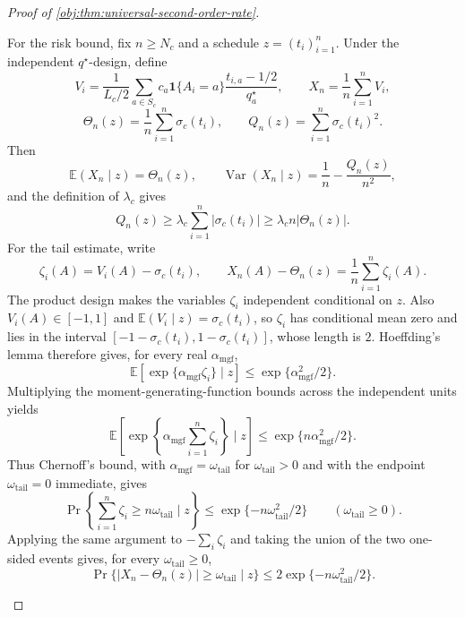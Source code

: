 \begin{proof}[Proof of \cref{obj:thm:universal-second-order-rate}]
\begin{enumerate}
For the risk bound, fix \(n\ge N_c\) and a schedule \(z=(t_i)_{i=1}^n\). Under the independent \(q^\star\)-design, define
\[
V_i=\frac{1}{L_c/2}
\sum_{a\in S_c}
c_a\mathbf 1\{A_i=a\}\frac{t_{i,a}-1/2}{q_a^\star},
\qquad
X_n=\frac1n\sum_{i=1}^n V_i,
\]
\[
\Theta_n(z)=\frac1n\sum_{i=1}^n\sigma_c(t_i),
\qquad
Q_n(z)=\sum_{i=1}^n\sigma_c(t_i)^2 .
\]
Then
\[
\mathbb E(X_n\mid z)=\Theta_n(z),
\qquad
\operatorname{Var}(X_n\mid z)=\frac1n-\frac{Q_n(z)}{n^2},
\]
and the definition of \(\lambda_c\) gives
\[
Q_n(z)\ge \lambda_c\sum_{i=1}^n|\sigma_c(t_i)|
\ge \lambda_c n|\Theta_n(z)|.
\]
For the tail estimate, write
\[
\zeta_i(A)=V_i(A)-\sigma_c(t_i),
\qquad
X_n(A)-\Theta_n(z)=\frac1n\sum_{i=1}^n\zeta_i(A).
\]
The product design makes the variables \(\zeta_i\) independent conditional on \(z\). Also \(V_i(A)\in[-1,1]\) and \(\mathbb E(V_i\mid z)=\sigma_c(t_i)\), so \(\zeta_i\) has conditional mean zero and lies in the interval \([-1-\sigma_c(t_i),1-\sigma_c(t_i)]\), whose length is \(2\). Hoeffding's lemma therefore gives, for every real \(\alpha_{\mathrm{mgf}}\),
\[
\mathbb E\!\left[\exp\{\alpha_{\mathrm{mgf}}\zeta_i\}\mid z\right]
\le
\exp\{\alpha_{\mathrm{mgf}}^2/2\}.
\]
Multiplying the moment-generating-function bounds across the independent units yields
\[
\mathbb E\!\left[\exp\!\left\{\alpha_{\mathrm{mgf}}\sum_{i=1}^n\zeta_i\right\}\mid z\right]
\le
\exp\{n\alpha_{\mathrm{mgf}}^2/2\}.
\]
Thus Chernoff's bound, with \(\alpha_{\mathrm{mgf}}=\omega_{\mathrm{tail}}\) for \(\omega_{\mathrm{tail}}>0\) and with the endpoint \(\omega_{\mathrm{tail}}=0\) immediate, gives
\[
\Pr\!\left\{\sum_{i=1}^n\zeta_i\ge n\omega_{\mathrm{tail}}\mid z\right\}
\le \exp\{-n\omega_{\mathrm{tail}}^2/2\}
\qquad(\omega_{\mathrm{tail}}\ge0).
\]
Applying the same argument to \(-\sum_i\zeta_i\) and taking the union of the two one-sided events gives, for every \(\omega_{\mathrm{tail}}\ge0\),
\[
\Pr\{|X_n-\Theta_n(z)|\ge \omega_{\mathrm{tail}}\mid z\}
\le 2\exp\{-n\omega_{\mathrm{tail}}^2/2\}.
\]


\end{enumerate}
\end{proof}
